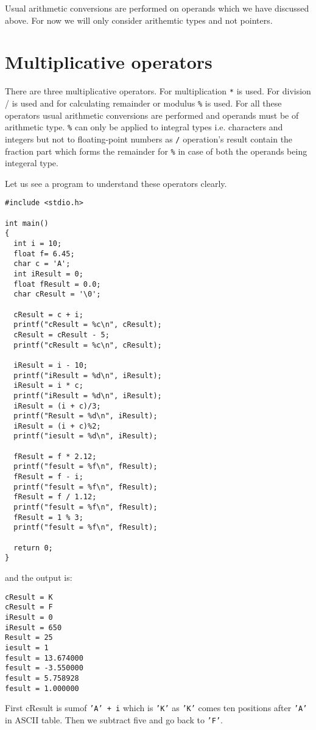 Usual arithmetic conversions are performed on operands which we have discussed
above. For now we will only consider arithemtic types and not pointers.

\section{Multiplicative operators}
There are three multiplicative operators. For multiplication \texttt{*} is
used. For division / is used and for calculating remainder or modulus
\texttt{\%} is used. For all these operators usual arithmetic conversions are
performed and operands must be of arithmetic type. \texttt{\%} can only be
applied to integral types i.e. characters and integers but not to
floating-point numbers as \texttt{/} operation's result contain the fraction
part which forms the remainder for \texttt{\%} in case of both the operands
being integeral type.

Let us see a program to understand these operators clearly.
\begin{Verbatim}[frame=single]
#include <stdio.h>

int main()
{
  int i = 10;
  float f= 6.45;
  char c = 'A';
  int iResult = 0;
  float fResult = 0.0;
  char cResult = '\0';

  cResult = c + i;
  printf("cResult = %c\n", cResult);
  cResult = cResult - 5;
  printf("cResult = %c\n", cResult);

  iResult = i - 10;
  printf("iResult = %d\n", iResult);
  iResult = i * c;
  printf("iResult = %d\n", iResult);
  iResult = (i + c)/3;
  printf("Result = %d\n", iResult);
  iResult = (i + c)%2;
  printf("iesult = %d\n", iResult);

  fResult = f * 2.12;
  printf("fesult = %f\n", fResult);
  fResult = f - i;
  printf("fesult = %f\n", fResult);  
  fResult = f / 1.12;
  printf("fesult = %f\n", fResult);
  fResult = 1 % 3;
  printf("fesult = %f\n", fResult);

  return 0;
}
\end{Verbatim}

and the output is:

\begin{Verbatim}
cResult = K
cResult = F
iResult = 0
iResult = 650
Result = 25
iesult = 1
fesult = 13.674000
fesult = -3.550000
fesult = 5.758928
fesult = 1.000000
\end{Verbatim}

First cResult is sumof \texttt{'A' + i} which is \texttt{'K'} as \texttt{'K'}
comes ten positions after \texttt{'A'} in ASCII table. Then we subtract five and
go back to \texttt{'F'}.

